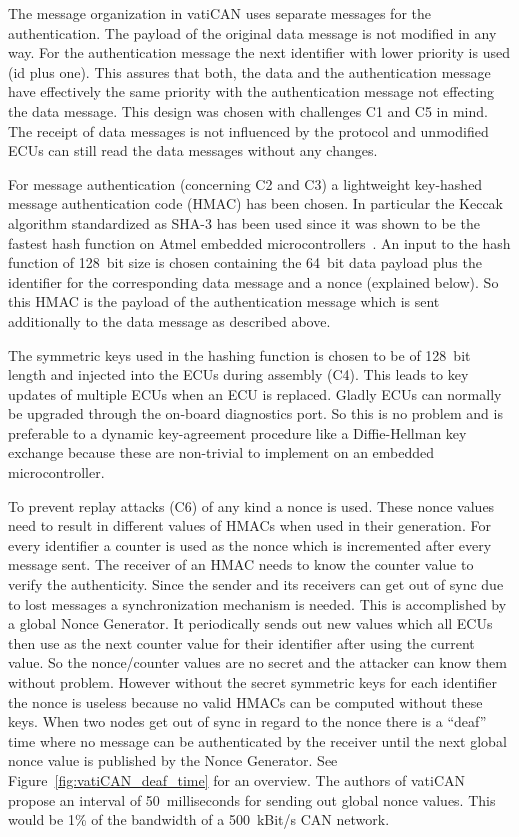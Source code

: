 The message organization in vatiCAN uses separate messages for the
authentication. The payload of the original data message is not modified in any
way. For the authentication message the next identifier with lower priority is
used (id plus one). This assures that both, the data and the authentication
message have effectively the same priority with the authentication message
not effecting the data message. This design was chosen with challenges C1 and C5
in mind. The receipt of data messages is not influenced by the protocol and
unmodified ECUs can still read the data messages without any changes.

For message authentication (concerning C2 and C3) a lightweight key-hashed
message authentication code (HMAC) has been chosen. In particular the Keccak
algorithm standardized as SHA-3 has been used since it was shown to be the
fastest hash function on Atmel embedded microcontrollers~\cite{Eisenbarth2012}.
An input to the hash function of 128~bit size is chosen containing the 64~bit
data payload plus the identifier for the corresponding data message and a nonce
(explained below). So this HMAC is the payload of the authentication message
which is sent additionally to the data message as described above.

The symmetric keys used in the hashing function is chosen to be of 128~bit
length and injected into the ECUs during assembly (C4). This leads to key
updates of multiple ECUs when an ECU is replaced. Gladly ECUs can normally be
upgraded through the on-board diagnostics port. So this is no problem and is
preferable to a dynamic key-agreement procedure like a Diffie-Hellman key
exchange because these are non-trivial to implement on an embedded
microcontroller.

To prevent replay attacks (C6) of any kind a nonce is used. These nonce values
need to result in different values of HMACs when used in their generation. For
every identifier a counter is used as the nonce which is incremented after every
message sent. The receiver of an HMAC needs to know the counter value to verify
the authenticity. Since the sender and its receivers can get out of sync due to
lost messages a synchronization mechanism is needed. This is accomplished by a
global Nonce Generator. It periodically sends out new values which all ECUs then
use as the next counter value for their identifier after using the current
value. So the nonce/counter values are no secret and the attacker can know
them without problem. However without the secret symmetric keys for each
identifier the nonce is useless because no valid HMACs can be computed without
these keys. When two nodes get out of sync in regard to the nonce there is a
``deaf'' time where no message can be authenticated by the receiver until the
next global nonce value is published by the Nonce Generator. See
Figure~\ref{fig:vatiCAN_deaf_time} for an overview. The authors of vatiCAN
propose an interval of 50~milliseconds for sending out global nonce values. This
would be 1\% of the bandwidth of a 500~kBit/s CAN network.

